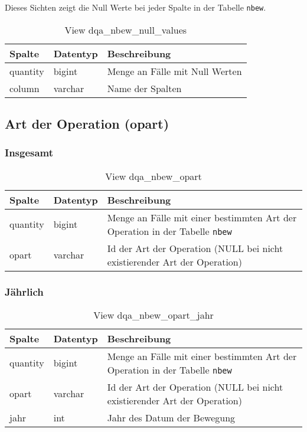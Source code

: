 Dieses Sichten zeigt die Null Werte bei jeder Spalte in der Tabelle \texttt{nbew}.

\begin{table}[ht]
	\centering   
	\caption{View dqa\_nbew\_null\_values}
	\label{tab:bewNull}
	\begin{tabular}{||l|l|p{10cm}||}   		
		\hline
		Spalte & Datentyp & Beschreibung \\ [0.5ex]
		\hline\hline
		quantity & bigint & Menge an Fälle mit Null Werten \\
		\hline
		column & varchar & Name der Spalten \\
		\hline		
	\end{tabular}
\end{table}

\subsection{Art der Operation (opart)} \label{subsec:bewOpart}

\subsubsection{Insgesamt} \label{subsubsec:bewOpartI}

\begin{table}[ht]
	\centering   
	\caption{View dqa\_nbew\_opart}
	\label{tab:bewOpartI}
	\begin{tabular}{||l|l|p{10cm}||}   		
		\hline
		Spalte & Datentyp & Beschreibung \\ [0.5ex]
		\hline\hline
		quantity & bigint & Menge an Fälle mit einer bestimmten Art der Operation in der Tabelle \texttt{nbew} \\
		\hline
		opart & varchar & Id der Art der Operation (NULL bei nicht existierender Art der Operation)\\
		\hline
	\end{tabular}
\end{table}

\subsubsection{Jährlich} \label{subsubsec:bewOpartJ}

\begin{table}[ht]
	\centering   
	\caption{View dqa\_nbew\_opart\_jahr}
	\label{tab:bewOpartJ}
	\begin{tabular}{||l|l|p{10cm}||}   		
		\hline
		Spalte & Datentyp & Beschreibung \\ [0.5ex]
		\hline\hline
		quantity & bigint & Menge an Fälle mit einer bestimmten Art der Operation in der Tabelle \texttt{nbew}\\
		\hline
		opart & varchar & Id der Art der Operation (NULL bei nicht existierender Art der Operation)\\
		\hline
		jahr & int &  Jahr des Datum der Bewegung \\
		\hline		
	\end{tabular}
\end{table}
\newpage

